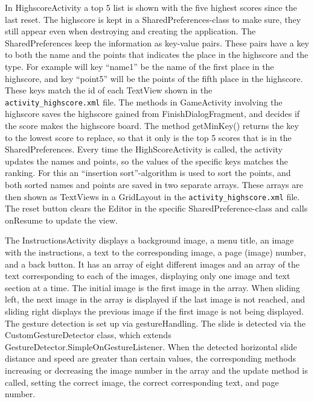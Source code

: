 In HighscoreActivity a top 5 list is shown with the five highest scores since the last reset. The highscore is kept in a SharedPreferences-class to make sure, they still appear even when destroying and creating the application. The SharedPreferences keep the information as key-value pairs. These pairs have a key to both the name and the points that indicates the place in the highscore and the type. For example will key “name1” be the name of the first place in the highscore, and key “point5” will be the points of the fifth place in the highscore. These keys match the id of each TextView shown in the \verb|activity_highscore.xml| file. The methods in GameActivity involving the highscore saves the highscore gained from FinishDialogFragment, and decides if the score makes the highscore board. The method getMinKey() returns the key to the lowest score to replace, so that it only is the top 5 scores that is in the SharedPreferences. 
Every time the HighScoreActivity is called, the activity updates the names and points, so the values of the specific keys matches the ranking. For this an “insertion sort”-algorithm is used to sort the points, and both sorted names and points are saved in two separate arrays. These arrays are then shown as TextViews in a GridLayout in the \verb|activity_highscore.xml| file.
The reset button clears the Editor in the specific SharedPreference-class and calls onResume to update the view.  \newline

The InstructionsActivity displays a background image, a menu title, an image with the instructions, a text to the corresponding image, a page (image) number, and a back button. It has an array of eight different images and an array of the text corresponding to each of the images, displaying only one image and text section at a time. The initial image is the first image in the array. When sliding left, the next image in the array is displayed if the last image is not reached, and sliding right displays the previous image if the first image is not being displayed. The gesture detection is set up via gestureHandling. The slide is detected via the CustomGestureDetector class, which extends GestureDetector.SimpleOnGestureListener. When the detected horizontal slide distance and speed are greater than certain values, the corresponding methods increasing or decreasing the image number in the array and the update method is called, setting the correct image, the correct corresponding text, and page number. \newline

